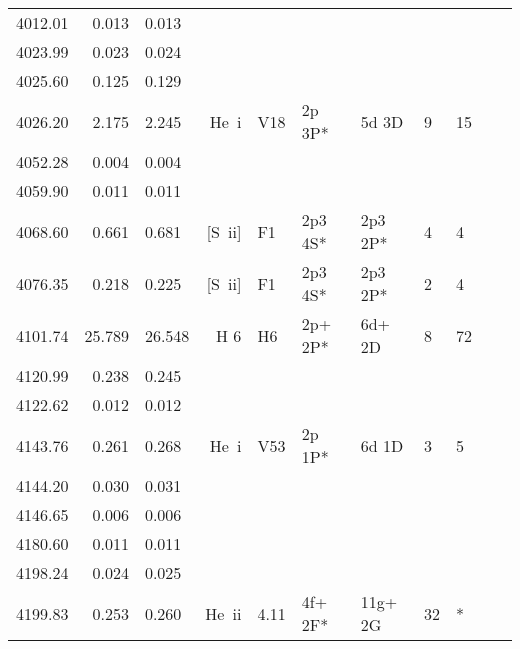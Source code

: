 \begin{longtable}{lrlrlllllll}
 4012.01 &   0.013 &   0.013                                                                                      \\
 4023.99 &   0.023 &   0.024                                                                                      \\
 4025.60 &   0.125 &   0.129                                                                                      \\
 4026.20 &   2.175 &   2.245 &  He~{\sc i}      &  V18       &  2p 3P*    &  5d 3D     &          9 &       15    \\
 4052.28 &   0.004 &   0.004                                                                                      \\
 4059.90 &   0.011 &   0.011                                                                                      \\
 4068.60 &   0.661 &   0.681 &  [S~{\sc ii}]    &  F1        &  2p3 4S*   &  2p3 2P*   &          4 &        4    \\
 4076.35 &   0.218 &   0.225 &  [S~{\sc ii}]    &  F1        &  2p3 4S*   &  2p3 2P*   &          2 &        4    \\
 4101.74 &  25.789 &  26.548 &  H 6       &  H6        &  2p+ 2P*   &  6d+ 2D    &          8 &       72          \\
 4120.99 &   0.238 &   0.245                                                                                      \\
 4122.62 &   0.012 &   0.012                                                                                      \\
 4143.76 &   0.261 &   0.268 &  He~{\sc i}      &  V53       &  2p 1P*    &  6d 1D     &          3 &        5    \\
 4144.20 &   0.030 &   0.031                                                                                      \\
 4146.65 &   0.006 &   0.006                                                                                      \\
 4180.60 &   0.011 &   0.011                                                                                      \\
 4198.24 &   0.024 &   0.025                                                                                      \\
 4199.83 &   0.253 &   0.260 &  He~{\sc ii}     &  4.11      &  4f+ 2F*   &  11g+ 2G   &         32 &        *    \\

\end{longtable}
